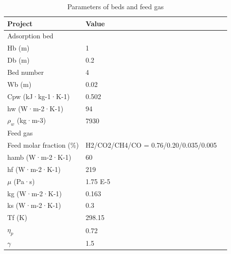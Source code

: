 \documentclass[preprint,12pt]{elsarticle}
\begin{document}
\begin{table}[]
	\centering
	\caption{Parameters of beds and feed gas}
	\begin{tabular}{lll}
	\toprule
		Project                  & Value                                 &  \\
		\midrule
		Adsorption bed           &                                       &  \\
		Hb (m)                   & 1                                     &  \\
		Db (m)                   & 0.2                                   &  \\
		Bed number               & 4                                     &  \\
		Wb (m)                   & 0.02                                  &  \\
		Cpw (kJ·kg-1·K-1)        & 0.502                                 &  \\
		hw (W·m-2·K-1)           & 94                                    &  \\
		$\rho_w$ (kg·m-3)              & 7930                                  &  \\
		Feed gas                 &                                       &  \\
		Feed molar fraction (\%) & H2/CO2/CH4/CO = 0.76/0.20/0.035/0.005 &  \\
		hamb (W·m-2·K-1)         & 60                                    &  \\
		hf (W·m-2·K-1)           & 219                                   &  \\
		$\mu$ (Pa·s)                 & 1.75 E-5                              &  \\
		kg (W·m-2·K-1)           & 0.163                                 &  \\
		ks (W·m-2·K-1)           & 0.3                                   &  \\
		Tf (K)                   & 298.15                                &  \\
		$\eta_p$                       & 0.72                                  &  \\
		$\gamma$                        & 1.5                                   & \\
		\bottomrule
	\end{tabular}
	\label{TABLE:1}
\end{table}
\end{document}
